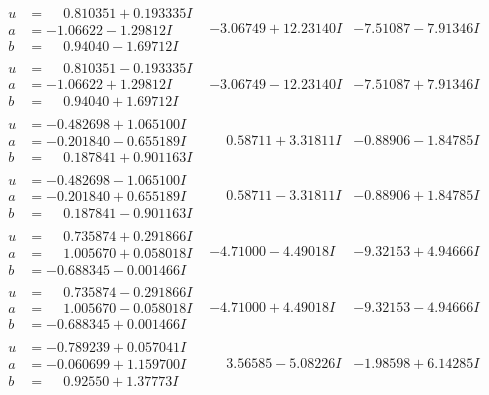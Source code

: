 \documentclass[1p]{elsarticle_modified}
\theoremstyle{definition}
\begin{document}
$$\begin{array}{c|c|c}
\begin{aligned}
u &= \phantom{-}0.810351 + 0.193335 I \\
a &= -1.06622 - 1.29812 I \\
b &= \phantom{-}0.94040 - 1.69712 I\end{aligned}
 & -3.06749 + 12.23140 I & -7.51087 - 7.91346 I \\ \hline\begin{aligned}
u &= \phantom{-}0.810351 - 0.193335 I \\
a &= -1.06622 + 1.29812 I \\
b &= \phantom{-}0.94040 + 1.69712 I\end{aligned}
 & -3.06749 - 12.23140 I & -7.51087 + 7.91346 I \\ \hline\begin{aligned}
u &= -0.482698 + 1.065100 I \\
a &= -0.201840 - 0.655189 I \\
b &= \phantom{-}0.187841 + 0.901163 I\end{aligned}
 & \phantom{-}0.58711 + 3.31811 I & -0.88906 - 1.84785 I \\ \hline\begin{aligned}
u &= -0.482698 - 1.065100 I \\
a &= -0.201840 + 0.655189 I \\
b &= \phantom{-}0.187841 - 0.901163 I\end{aligned}
 & \phantom{-}0.58711 - 3.31811 I & -0.88906 + 1.84785 I \\ \hline\begin{aligned}
u &= \phantom{-}0.735874 + 0.291866 I \\
a &= \phantom{-}1.005670 + 0.058018 I \\
b &= -0.688345 - 0.001466 I\end{aligned}
 & -4.71000 - 4.49018 I & -9.32153 + 4.94666 I \\ \hline\begin{aligned}
u &= \phantom{-}0.735874 - 0.291866 I \\
a &= \phantom{-}1.005670 - 0.058018 I \\
b &= -0.688345 + 0.001466 I\end{aligned}
 & -4.71000 + 4.49018 I & -9.32153 - 4.94666 I \\ \hline\begin{aligned}
u &= -0.789239 + 0.057041 I \\
a &= -0.060699 + 1.159700 I \\
b &= \phantom{-}0.92550 + 1.37773 I\end{aligned}
 & \phantom{-}3.56585 - 5.08226 I & -1.98598 + 6.14285 I \\ \hline\begin{aligned}

\end{aligned}
\end{array}$$
\end{document}
